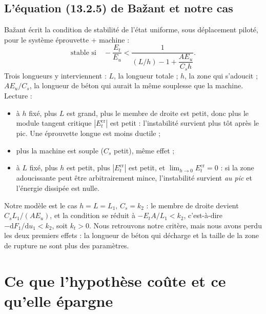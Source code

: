 \documentclass[11pt,a4paper]{article}
\newcommand{\dd}{\mathrm{d}}
\begin{document}
\subsection{L'équation (13.2.5) de Bažant et notre cas}
Bažant écrit la condition de stabilité de l'état uniforme, sous déplacement piloté, pour le
système éprouvette + machine :
\begin{equation}
  \text{stable si}\quad -\frac{E_t}{E_u} < \frac{1}{(L/h) - 1 + \dfrac{AE_u}{C_sh}} .
  \tag{13.2.5}
\end{equation}
Trois longueurs y interviennent : $L$, la longueur totale ; $h$, la zone qui s'adoucit ;
$AE_u/C_s$, la longueur de béton qui aurait la même souplesse que la machine. Lecture :
\begin{itemize}[nosep]
  \item à $h$ fixé, plus $L$ est grand, plus le membre de droite est petit, donc plus le module
        tangent critique $|E_t^{\text{cr}}|$ est petit : l'instabilité survient plus tôt après le
        pic. Une éprouvette longue est moins ductile ;
  \item plus la machine est souple ($C_s$ petit), même effet ;
  \item à $L$ fixé, plus $h$ est petit, plus $|E_t^{\text{cr}}|$ est petit, et
        $\lim_{h\to0}E_t^{\text{cr}} = 0$ : si la zone adoucissante peut être arbitrairement mince,
        l'instabilité survient \emph{au pic} et l'énergie dissipée est nulle.
\end{itemize}
Notre modèle est le cas $h = L = L_1$, $C_s = k_2$ : le membre de droite devient $C_sL_1/(AE_u)$,
et la condition se réduit à $-E_tA/L_1 < k_2$, c'est-à-dire $-\dd F_1/\dd u_1 < k_2$, soit $k_t > 0$.
Nous retrouvons notre critère, mais nous avons perdu les deux premiers effets : la longueur
de béton qui décharge et la taille de la zone de rupture ne sont plus des paramètres.

\section{Ce que l'hypothèse coûte et ce qu'elle épargne}
\end{document}
